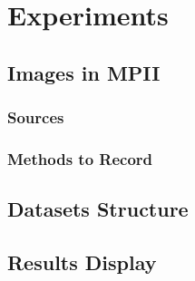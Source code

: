 \documentclass[senior]{IPSstyle}
\begin{document}
\chapter{Experiments} \label{experiments}
\section{Images in MPII}
\subsection{Sources}
\subsection{Methods to Record}
\section{Datasets Structure}
\section{Results Display}




\end{document}
